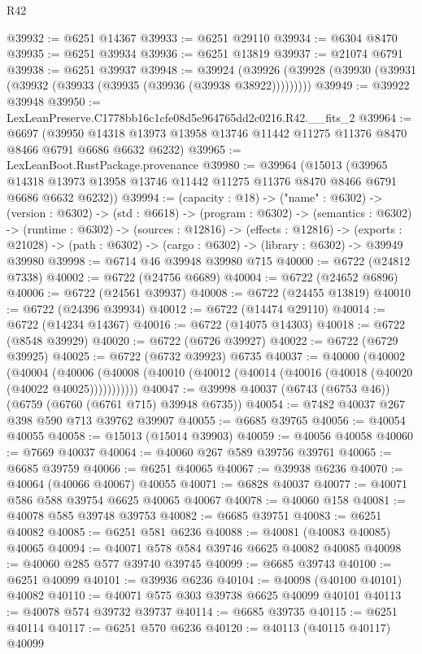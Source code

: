 \begin{lexlean}{R42}
\begin{coremodule}
{@39932 := @6251 @14367
@39933 := @6251 @29110
@39934 := @6304 @8470
@39935 := @6251 @39934
@39936 := @6251 @13819
@39937 := @21074 @6791
@39938 := @6251 @39937
@39948 := @39924
    (@39926 (@39928 (@39930 (@39931 (@39932 (@39933 (@39935 (@39936 (@39938 @38922)))))))))
@39949 := @39922 @39948
@39950 := LexLeanPreserve.C1778bb16c1cfe08d5e964765dd2c0216.R42.__fits_2
@39964 := @6697
    (@39950 @14318 @13973 @13958 @13746 @11442 @11275 @11376 @8470 @8466 @6791 @6686 @6632 @6232)
@39965 := LexLeanBoot.RustPackage.provenance
@39980 := @39964
    (@15013
      (@39965 @14318 @13973 @13958 @13746 @11442 @11275 @11376 @8470 @8466 @6791 @6686 @6632 @6232))
@39994 := (capacity : @18) ->
  ("name" : @6302) ->
  (version : @6302) ->
  (std : @6618) ->
  (program : @6302) ->
  (semantics : @6302) ->
  (runtime : @6302) ->
  (sources : @12816) ->
  (effects : @12816) ->
  (exports : @21028) -> (path : @6302) -> (cargo : @6302) -> (library : @6302) -> @39949 @39980
@39998 := @6714 @46 @39948 @39980 @715
@40000 := @6722 (@24812 @7338)
@40002 := @6722 (@24756 @6689)
@40004 := @6722 (@24652 @6896)
@40006 := @6722 (@24561 @39937)
@40008 := @6722 (@24455 @13819)
@40010 := @6722 (@24396 @39934)
@40012 := @6722 (@14474 @29110)
@40014 := @6722 (@14234 @14367)
@40016 := @6722 (@14075 @14303)
@40018 := @6722 (@8548 @39929)
@40020 := @6722 (@6726 @39927)
@40022 := @6722 (@6729 @39925)
@40025 := @6722 (@6732 @39923) @6735
@40037 := @40000
    (@40002
      (@40004
        (@40006 (@40008 (@40010 (@40012 (@40014 (@40016 (@40018 (@40020 (@40022 @40025)))))))))))
@40047 := @39998 @40037 (@6743 (@6753 @46)) (@6759 (@6760 (@6761 @715) @39948 @6735))
@40054 := @7482 @40037 @267 @398 @590 @713 @39762 @39907
@40055 := @6685 @39765
@40056 := @40054 @40055
@40058 := @15013 (@15014 @39903)
@40059 := @40056 @40058
@40060 := @7669 @40037
@40064 := @40060 @267 @589 @39756 @39761
@40065 := @6685 @39759
@40066 := @6251 @40065
@40067 := @39938 @6236
@40070 := @40064 (@40066 @40067) @40055
@40071 := @6828 @40037
@40077 := @40071 @586 @588 @39754 @6625 @40065 @40067
@40078 := @40060 @158
@40081 := @40078 @585 @39748 @39753
@40082 := @6685 @39751
@40083 := @6251 @40082
@40085 := @6251 @581 @6236
@40088 := @40081 (@40083 @40085) @40065
@40094 := @40071 @578 @584 @39746 @6625 @40082 @40085
@40098 := @40060 @285 @577 @39740 @39745
@40099 := @6685 @39743
@40100 := @6251 @40099
@40101 := @39936 @6236
@40104 := @40098 (@40100 @40101) @40082
@40110 := @40071 @575 @303 @39738 @6625 @40099 @40101
@40113 := @40078 @574 @39732 @39737
@40114 := @6685 @39735
@40115 := @6251 @40114
@40117 := @6251 @570 @6236
@40120 := @40113 (@40115 @40117) @40099
}
\end{coremodule}
\end{lexlean}
